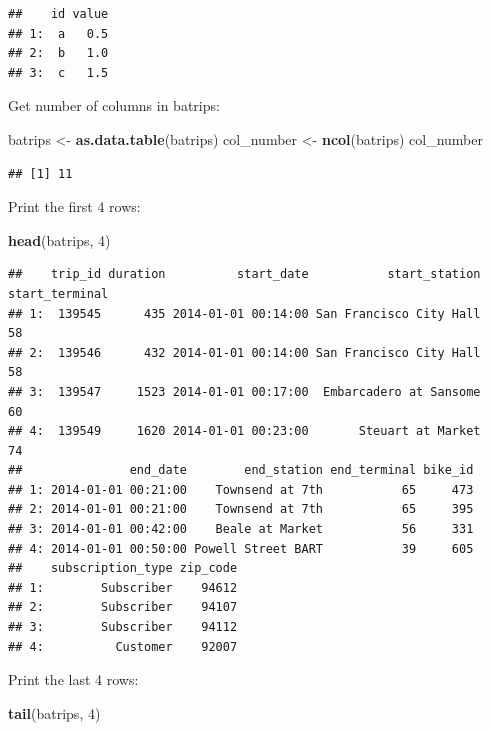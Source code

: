 \documentclass[]{book}
\newenvironment{Shaded}{\begin{snugshade}}{\end{snugshade}}
\newcommand{\DecValTok}[1]{\textcolor[rgb]{0.00,0.00,0.81}{#1}}
\newcommand{\KeywordTok}[1]{\textcolor[rgb]{0.13,0.29,0.53}{\textbf{#1}}}
\newcommand{\NormalTok}[1]{#1}
\newcommand{\StringTok}[1]{\textcolor[rgb]{0.31,0.60,0.02}{#1}}
\begin{document}
\begin{verbatim}
##    id value
## 1:  a   0.5
## 2:  b   1.0
## 3:  c   1.5
\end{verbatim}

Get number of columns in batrips:

\begin{Shaded}
\begin{Highlighting}[]
\NormalTok{batrips <-}\StringTok{ }\KeywordTok{as.data.table}\NormalTok{(batrips)}
\NormalTok{col_number <-}\StringTok{ }\KeywordTok{ncol}\NormalTok{(batrips)}
\NormalTok{col_number}
\end{Highlighting}
\end{Shaded}

\begin{verbatim}
## [1] 11
\end{verbatim}

Print the first 4 rows:

\begin{Shaded}
\begin{Highlighting}[]
\KeywordTok{head}\NormalTok{(batrips, }\DecValTok{4}\NormalTok{)}
\end{Highlighting}
\end{Shaded}

\begin{verbatim}
##    trip_id duration          start_date           start_station start_terminal
## 1:  139545      435 2014-01-01 00:14:00 San Francisco City Hall             58
## 2:  139546      432 2014-01-01 00:14:00 San Francisco City Hall             58
## 3:  139547     1523 2014-01-01 00:17:00  Embarcadero at Sansome             60
## 4:  139549     1620 2014-01-01 00:23:00       Steuart at Market             74
##               end_date        end_station end_terminal bike_id
## 1: 2014-01-01 00:21:00    Townsend at 7th           65     473
## 2: 2014-01-01 00:21:00    Townsend at 7th           65     395
## 3: 2014-01-01 00:42:00    Beale at Market           56     331
## 4: 2014-01-01 00:50:00 Powell Street BART           39     605
##    subscription_type zip_code
## 1:        Subscriber    94612
## 2:        Subscriber    94107
## 3:        Subscriber    94112
## 4:          Customer    92007
\end{verbatim}

Print the last 4 rows:

\begin{Shaded}
\begin{Highlighting}[]
\KeywordTok{tail}\NormalTok{(batrips, }\DecValTok{4}\NormalTok{)}
\end{Highlighting}
\end{Shaded}
\end{document}
